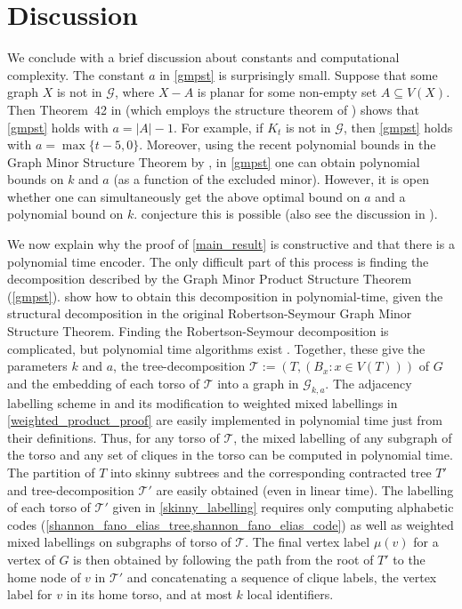 \documentclass{patmorin}
\begin{document}
\section{Discussion}\label{conclusion}

We conclude with a brief discussion about constants and computational complexity.  The constant $a$ in \cref{gmpst} is surprisingly small. Suppose that some graph $X$ is not in $\mathcal{G}$, where $X-A$ is planar for some non-empty set $A\subseteq V(X)$. Then Theorem~42 in \citep{dujmovic.joret.ea:planar} (which employs the structure theorem of \citet{DvoTho}) shows that \cref{gmpst} holds with $a=|A|-1$. For example, if $K_t$ is not in $\mathcal{G}$, then \cref{gmpst} holds with $a=\max\{t-5,0\}$. Moreover, using the recent polynomial bounds in the Graph Minor Structure Theorem by \citet{gorsky2025polynomial}, in \cref{gmpst} one can obtain polynomial bounds on $k$ and $a$ (as a function of the excluded minor). However, it is open whether one can simultaneously get the above optimal bound on $a$ and a polynomial bound on $k$. \citet[Conjecture~18.9]{gorsky2025polynomial} conjecture this is possible (also see the discussion in \citep{GSW26}).


We now explain why the proof of \cref{main_result} is constructive and that there is a polynomial time encoder.  The only difficult part of this process is finding the decomposition described by the Graph Minor Product Structure Theorem (\cref{gmpst}).  \citet{dujmovic.joret.ea:planar} show how to obtain this decomposition in polynomial-time, given the structural decomposition in the original Robertson-Seymour Graph Minor Structure Theorem. Finding the Robertson-Seymour decomposition is complicated, but polynomial time algorithms exist \cite{kawarabayashi2018flat,kawarabayashi2020new,gorsky2025polynomial,demaine2005algorithmic}.  Together, these give the parameters $k$ and $a$, the tree-decomposition $\mathcal{T}:=(T, (B_x:x\in V(T)))$ of $G$ and the embedding of each torso of $\mathcal{T}$ into a graph in $\mathcal{G}_{k,a}$. The adjacency labelling scheme in \cite{dujmovic.esperet.ea:adjacency} and its modification to weighted mixed labellings in \cref{weighted_product_proof} are easily implemented in polynomial time just from their definitions.  Thus, for any torso of $\mathcal{T}$, the mixed labelling of any subgraph of the torso and any set of cliques in the torso can be computed in polynomial time.  The partition of $T$ into skinny subtrees and the corresponding contracted tree $T'$ and tree-decomposition $\mathcal{T}'$ are easily obtained (even in linear time).  The labelling of each torso of $\mathcal{T}'$ given in \cref{skinny_labelling} requires only computing  alphabetic codes (\cref{shannon_fano_elias_tree,shannon_fano_elias_code}) as well as weighted mixed labellings on subgraphs of torso of $\mathcal{T}$.  The final vertex label $\mu(v)$ for a vertex of $G$ is then obtained by following the path from the root of $T'$ to the home node of $v$ in $\mathcal{T}'$ and concatenating a sequence of clique labels, the vertex label for $v$ in its home torso, and at most $k$ local identifiers.
\end{document}
